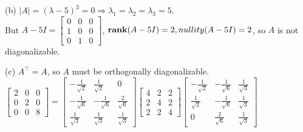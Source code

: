 (b) $|A|=(\lambda-5)^3=0\Rightarrow \lambda_1=\lambda_2=\lambda_3=5$. \\
But $A-5I=\begin{bmatrix} 0 & 0 & 0 \\ 1 & 0 & 0 \\ 0 & 1 & 0 \end{bmatrix}$, $\mathop{\bf rank}(A-5I)=2, nullity(A-5I)=2$, so $A$ is not diagonalizable.

(c) $A^{\top}=A$, so $A$ must be orthogonally diagonalizable. \\
$\begin{bmatrix}2 & 0 & 0 \\ 0 & 2 & 0 \\ 0 & 0 & 8 \end{bmatrix} = \begin{bmatrix} -\frac{1}{\sqrt{2}} & \frac{1}{\sqrt{2}} & 0 \\ -\frac{1}{\sqrt{6}} & -\frac{1}{\sqrt{6}} & \frac{2}{\sqrt{6}} \\ \frac{1}{\sqrt{3}} & \frac{1}{\sqrt{3}} & \frac{1}{\sqrt{3}} \end{bmatrix} \begin{bmatrix} 4 & 2 & 2 \\ 2 & 4 & 2 \\ 2 & 2 & 4 \end{bmatrix} \begin{bmatrix} -\frac{1}{\sqrt{2}} & -\frac{1}{\sqrt{6}} & \frac{1}{\sqrt{3}} \\ \frac{1}{\sqrt{2}} & -\frac{1}{\sqrt{6}} & \frac{1}{\sqrt{3}} \\ 0 & \frac{2}{\sqrt{6}} & \frac{1}{\sqrt{3}} \end{bmatrix}$

\newpage